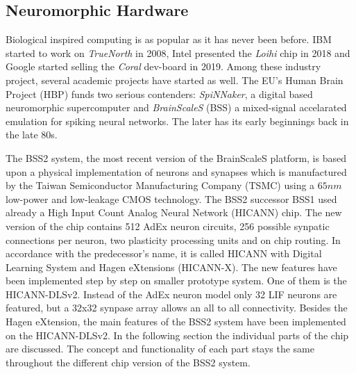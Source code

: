 %

\subsection{Neuromorphic Hardware}

Biological inspired computing is as popular as it has never been before. IBM started to work on \textit{TrueNorth} in 2008, Intel presented the \textit{Loihi} chip in 2018 and Google started selling the \textit{Coral} dev-board in 2019. Among these industry project, several academic projects have started as well. The EU's Human Brain Project (HBP) funds two serious contenders: \textit{SpiNNaker}, a digital based neuromorphic supercomputer and \textit{BrainScaleS} (BSS) a mixed-signal accelarated emulation for spiking neural networks. The later has its early beginnings back in the late 80s.

The BSS2 system, the most recent version of the BrainScaleS platform, is based upon a physical implementation of neurons and synapses which is manufactured by the Taiwan Semiconductor Manufacturing Company (TSMC) using a $65 \si{nm}$ low-power and low-leakage CMOS technology. The BSS2 successor BSS1 used already a High Input Count Analog Neural Network (HICANN) chip. The new version of the chip contains 512 AdEx neuron circuits, 256 possible synpatic connections per neuron, two plasticity processing units and on chip routing. In accordance with the predecessor's name, it is called HICANN with Digital Learning System and Hagen eXtensions (HICANN-X). The new features have been implemented step by step on smaller prototype system. One of them is the HICANN-DLSv2. Instead of the AdEx neuron model only 32 LIF neurons are featured, but a 32x32 synpase array allows an all to all connectivity. Besides the Hagen eXtension, the main features of the BSS2 system have been implemented on the HICANN-DLSv2. In the following section the individual parts of the chip are discussed. The concept and functionality of each part stays the same throughout the different chip version of the BSS2 system.

